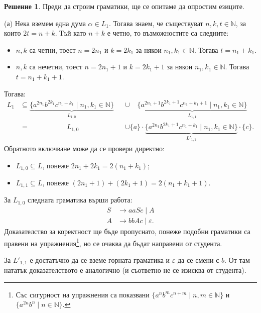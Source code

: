\documentclass[12pt]{article}
\newcommand{\N}{\mathbb{N}}
\theoremstyle{definition}
\newtheorem*{solution}{Решение}
\begin{document}
\begin{solution}
  Преди да строим граматики, ще се опитаме да опростим езиците.

  (а) Нека вземем една дума $\alpha \in L_1$.
  Тогава знаем, че съществуват $n, k, t \in \N$, за които $2t = n + k$.
  Тъй като $n + k$ е четно, то възможностите са следните:
  \begin{itemize}
    \item[1 сл.] $n, k$ са четни, тоест $n = 2n_1$ и $k = 2k_1$ за някои $n_1, k_1 \in \N$.
                 Тогава $t = n_1 + k_1$.
    \item[2 сл.] $n, k$ са нечетни, тоест $n = 2n_1 + 1$ и $k = 2k_1 + 1$ за някои $n_1, k_1 \in \N$.
                 Тогава $t = n_1 + k_1 + 1$.
  \end{itemize}
  Тогава:
  \begin{align*}
    L_1 &\subseteq \underbrace{\{ a^{2n_1} b^{2k_1} c^{n_1 + k_1} \mid n_1, k_1 \in \N \}}_{L_{1, 0}} &&\cup \phantom{aa} \underbrace{\{ a^{2n_1 + 1} b^{2k_1 + 1} c^{n_1 + k_1 + 1} \mid n_1, k_1 \in \N \}}_{L_{1, 1}} \\
        &=  \phantom{aaaaaaaaaa}L_{1, 0}                                                                                  &&\cup \{ a \} \cdot \underbrace{\{ a^{2n_1} b^{2k_1 + 1} c^{n_1 + k_1} \mid n_1, k_1 \in \N \}}_{L'_{1, 1}} \cdot \{ c \}.
  \end{align*}
  Обратното включване може да се провери директно:
  \begin{itemize}
    \item $L_{1, 0} \subseteq L$, понеже $2n_1 + 2k_1 = 2(n_1 + k_1)$;
    \item $L_{1, 1} \subseteq L$, понеже $(2n_1 + 1) + (2k_1 + 1) = 2(n_1 + k_1 + 1)$.
  \end{itemize}
  За $L_{1, 0}$ следната граматика върши работа:
  \begin{align*}
    S & \longrightarrow aa S c \mid A \\
    A & \longrightarrow bb A c \mid \varepsilon.
  \end{align*}
  Доказателство за коректност ще бъде пропуснато, понеже подобни граматики са правени на упражнения\footnote[2]{Със сигурност на упражнения са показвани $\{ a^n b^m c^{n + m} \mid n, m \in \N\}$ и $\{ a^{2n} b^n \mid n \in \N \}$.}, но се очаква да бъдат направени от студента.

  За $L'_{1, 1}$ е достатъчно да се вземе горната граматика и $\varepsilon$ да се смени с $b$.
  От там нататък доказателството е аналогично (и съответно не се изисква от студента).


\end{solution}
\end{document}
